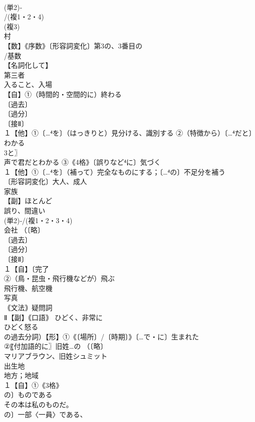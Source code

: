\documentclass[8pt]{extreport}
\begin{document}
\begin{CJK}{UTF8}{min}
\\	(単2)‐
\\	/(複1・2・4)
\\	(複3)
\\	村 
\\	【数】《序数》〔形容詞変化〕第3の、3番目の 
\\	/基数
\\	【名詞化して】
\\	第三者
\\	入ること、入場 
\\	【自】①（時間的・空間的に）終わる 
\\	〔過去〕
\\	〔過分〕
\\	〔接Ⅱ〕
\\	１【他】①〔…⁴を〕（はっきりと）見分ける、識別する ②（特徴から）〔…⁴だと〕わかる　
\\	3と〗
\\	声で君だとわかる ③《4格》〔誤りなど⁴に〕気づく
\\	１【他】①〔…⁴を〕（補って）完全なものにする；〔…⁴の〕不足分を補う 
\\	〔形容詞変化〕大人、成人 
\\	家族 
\\	【副】ほとんど 
\\	誤り、間違い 
\\	(単2)‐/(複1・2・3・4)
\\	会社 （〔略〕
\\	〔過去〕
\\	〔過分〕
\\	〔接Ⅱ〕
\\	１【自】〔完了
\\	②（鳥・昆虫・飛行機などが）飛ぶ
\\	飛行機、航空機 
\\	写真 
\\	｟文法｠疑問詞
\\	Ⅱ【副】｟口語｠ ひどく、非常に 
\\	ひどく怒る
\\	の過去分詞）【形】①《〔場所〕/〔時期〕》〔…で・に〕生まれた 
\\	②〖付加語的に〗旧姓…の （〔略〕
\\	マリアブラウン、旧姓シュミット
\\	出生地
\\	地方；地域 
\\	１【自】①《3格》
\\	の〕ものである 
\\	その本は私のものだ。 
\\	の〕一部〈一員〉である、

\end{CJK}
\end{document}
